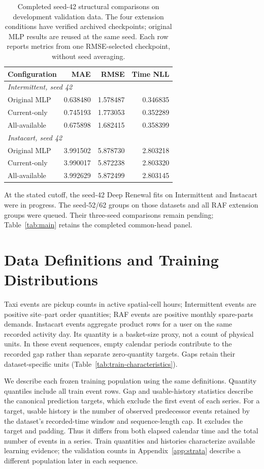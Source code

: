 \documentclass[runningheads]{llncs}
\begin{document}
\begin{table}[t]
\caption{Completed seed-42 structural comparisons on development validation
data. The four extension conditions have verified archived checkpoints;
original MLP results are reused at the same seed. Each row reports metrics
from one RMSE-selected checkpoint, without seed averaging.}
\label{tab:extension-seed42}\centering\small
\begin{tabular}{lrrr}
\toprule
Configuration & MAE & RMSE & Time NLL\\
\midrule
\multicolumn{4}{l}{\textit{Intermittent, seed 42}}\\
Original MLP & 0.638480 & 1.578487 & 0.346835\\
Current-only & 0.745193 & 1.773053 & 0.352289\\
All-available & 0.675898 & 1.682415 & 0.358399\\
\midrule
\multicolumn{4}{l}{\textit{Instacart, seed 42}}\\
Original MLP & 3.991502 & 5.878730 & 2.803218\\
Current-only & 3.990017 & 5.872238 & 2.803320\\
All-available & 3.992629 & 5.872499 & 2.803145\\
\bottomrule
\end{tabular}
\end{table}

At the stated cutoff, the seed-42 Deep Renewal fits on Intermittent and
Instacart were in progress. The seed-52/62 groups on those datasets and all
RAF extension groups were queued. Their three-seed comparisons remain
pending; Table~\ref{tab:main} retains the completed common-head panel.


\section{Data Definitions and Training Distributions}\label{app:data-characteristics}
Taxi events are pickup counts in active spatial-cell hours; Intermittent
events are positive site--part order quantities; RAF events are positive
monthly spare-parts demands. Instacart events aggregate product rows for a
user on the same recorded activity day. Its quantity is a basket-size proxy,
not a count of physical units. In these event sequences, empty calendar
periods contribute to the recorded gap rather than separate zero-quantity
targets. Gaps retain their dataset-specific units (Table~\ref{tab:train-characteristics}).

We describe each frozen training population using the same definitions.
Quantity quantiles include all train event rows. Gap and usable-history
statistics describe the canonical prediction targets, which exclude the
first event of each series. For a target, usable history is the number of
observed predecessor events retained by the dataset's recorded-time window
and sequence-length cap. It excludes the target and padding. Thus it differs
from both elapsed calendar time and the total number of events in a series.
Train quantities and histories characterize available learning evidence;
the validation counts in Appendix~\ref{app:strata} describe a different
population later in each sequence.
\end{document}
